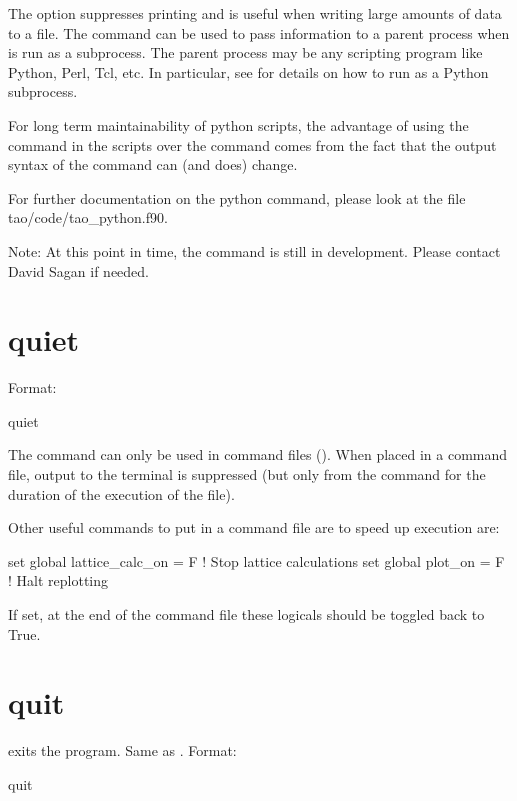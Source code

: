The  option suppresses printing and is useful when writing large amounts of
data to a file.  The  command can be used to pass information to a parent
process when \tao is run as a subprocess.  The parent process may be any scripting program
like Python, Perl, Tcl, etc.  In particular, see  for details on how to run
\tao as a Python subprocess.

For long term maintainability of python scripts, the advantage of using the 
command in the scripts over the  command comes from the fact that the output
syntax of the  command can (and does) change.

For further documentation on the python command, please look at the file tao/code/tao_python.f90.

Note: At this point in time, the  command is still in development.  Please
contact David Sagan if needed.

\section{quiet}
\label{s:quiet}

Format:
\begin{example}
  quiet
\end{example}

The  command can only be used in command files ().
When placed in a command file, output to the terminal is suppressed (but
only from the  command for the duration of the execution of the file).

Other useful commands to put in a command file are to speed up execution are:
\begin{example}
  set global lattice_calc_on = F   ! Stop lattice calculations
  set global plot_on = F           ! Halt replotting
\end{example}
If set, at the end of the command file these logicals should be toggled back to True.

\section{quit}
\label{s:quit}

 exits the program. Same as .
Format:
\begin{example}
  quit
\end{example}

